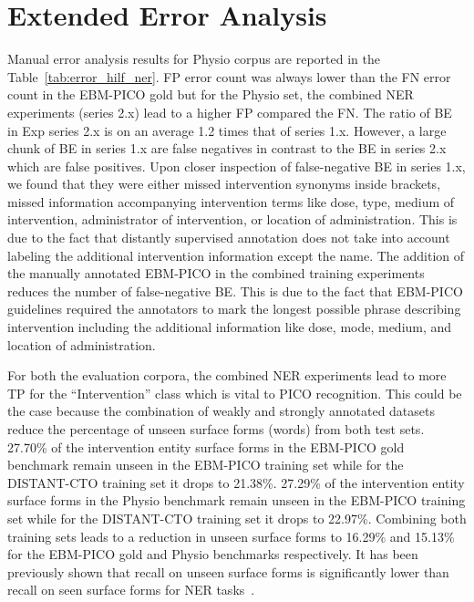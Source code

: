 \documentclass[11pt]{article}
\begin{document}
\section{Extended Error Analysis}
\label{error_extended}
%
Manual error analysis results for Physio corpus are reported in the Table~\ref{tab:error_hilf_ner}.
FP error count was always lower than the FN error count in the EBM-PICO gold but for the Physio set, the combined NER experiments (series 2.x) lead to a higher FP compared the FN.
The ratio of BE in Exp series 2.x is on an average 1.2 times that of series 1.x.
However, a large chunk of BE in series 1.x are false negatives in contrast to the BE in series 2.x which are false positives.
Upon closer inspection of false-negative BE in series 1.x, we found that they were either missed intervention synonyms inside brackets, missed information accompanying intervention terms like dose, type, medium of intervention, administrator of intervention, or location of administration.
This is due to the fact that distantly supervised annotation does not take into account labeling the additional intervention information except the name.
The addition of the manually annotated EBM-PICO in the combined training experiments reduces the number of false-negative BE.
This is due to the fact that EBM-PICO guidelines required the annotators to mark the longest possible phrase describing intervention including the additional information like dose, mode, medium, and location of administration.


For both the evaluation corpora, the combined NER experiments lead to more TP for the ``Intervention'' class which is vital to PICO recognition.
This could be the case because the combination of weakly and strongly annotated datasets reduce the percentage of unseen surface forms (words) from both test sets.
27.70\% of the intervention entity surface forms in the EBM-PICO gold benchmark remain unseen in the EBM-PICO training set while for the DISTANT-CTO training set it drops to 21.38\%.
27.29\% of the intervention entity surface forms in the Physio benchmark remain unseen in the EBM-PICO training set while for the DISTANT-CTO training set it drops to 22.97\%.
Combining both training sets leads to a reduction in unseen surface forms to 16.29\% and 15.13\% for the EBM-PICO gold and Physio benchmarks respectively.
It has been previously shown that recall on unseen surface forms is significantly lower than recall on seen surface forms for NER tasks~\cite{augenstein2017generalisation}.
\end{document}
